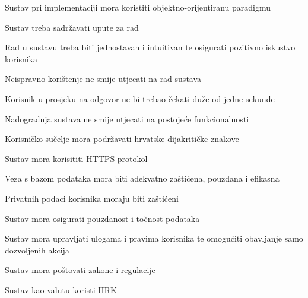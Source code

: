 			\begin{packed_item}
				\item Sustav pri implementaciji mora koristiti objektno-orijentiranu paradigmu
				\item Sustav treba sadržavati upute za rad
				\item Rad u sustavu treba biti jednostavan i intuitivan te osigurati pozitivno iskustvo korisnika
				\item Neispravno korištenje ne smije utjecati na rad sustava
				\item Korisnik u prosjeku na odgovor ne bi trebao čekati duže od jedne sekunde
				\item Nadogradnja sustava ne smije utjecati na postojeće funkcionalnosti 
				\item Korisničko sučelje mora podržavati hrvatske dijakritičke znakove
				\item Sustav mora korisititi HTTPS protokol
				\item Veza s bazom podataka mora biti adekvatno zaštićena, pouzdana i efikasna
				\item Privatnih podaci korisnika moraju biti zaštićeni
				\item Sustav mora osigurati pouzdanost i točnost podataka
				\item Sustav mora upravljati ulogama i pravima korisnika
				te omogućiti obavljanje samo dozvoljenih akcija 
				\item Sustav mora poštovati zakone i regulacije
				\item Sustav kao valutu koristi HRK
			\end{packed_item}
		
	